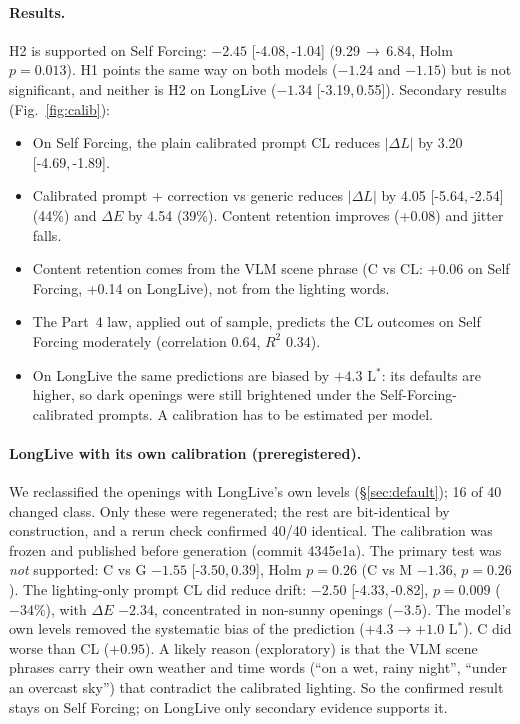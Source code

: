 \documentclass[11pt]{article}
\newcommand{\Lstar}{L$^{*}$}
\newcommand{\ci}[2]{[#1,\,#2]}
\begin{document}
\paragraph{Results.} H2 is supported on Self Forcing: $-2.45$ \ci{-4.08}{-1.04} (9.29\,$\to$\,6.84, Holm $p=0.013$).
H1 points the same way on both models ($-1.24$ and $-1.15$) but is not significant, and neither is H2 on LongLive
($-1.34$ \ci{-3.19}{0.55}). Secondary results (Fig.~\ref{fig:calib}):
\begin{itemize}
\item On Self Forcing, the plain calibrated prompt CL reduces $|\Delta L|$ by 3.20 \ci{-4.69}{-1.89}.
\item Calibrated prompt + correction vs generic reduces $|\Delta L|$ by 4.05 \ci{-5.64}{-2.54} (44\%) and $\Delta E$ by
4.54 (39\%). Content retention improves (+0.08) and jitter falls.
\item Content retention comes from the VLM scene phrase (C vs CL: +0.06 on Self Forcing, +0.14 on LongLive), not from
the lighting words.
\item The Part~4 law, applied out of sample, predicts the CL outcomes on Self Forcing moderately (correlation 0.64,
$R^2$ 0.34).
\item On LongLive the same predictions are biased by $+4.3$ \Lstar: its defaults are higher, so dark openings were
still brightened under the Self-Forcing-calibrated prompts. A calibration has to be estimated per model.
\end{itemize}

\paragraph{LongLive with its own calibration (preregistered).} We reclassified the openings with LongLive's own levels
(\S\ref{sec:default}); 16 of 40 changed class. Only these were regenerated; the rest are bit-identical by construction,
and a rerun check confirmed 40/40 identical. The calibration was frozen and published before generation (commit 4345e1a).
The primary test was \emph{not} supported: C vs G $-1.55$ \ci{-3.50}{0.39}, Holm $p=0.26$ (C vs M $-1.36$, $p=0.26$).
The lighting-only prompt CL did reduce drift: $-2.50$ \ci{-4.33}{-0.82}, $p=0.009$ ($-34\%$), with $\Delta E$ $-2.34$,
concentrated in non-sunny openings ($-3.5$). The model's own levels removed the systematic bias of the prediction
($+4.3\to+1.0$ \Lstar). C did worse than CL ($+0.95$). A likely reason (exploratory) is that the VLM scene phrases
carry their own weather and time words (``on a wet, rainy night'', ``under an overcast sky'') that contradict the
calibrated lighting. So the confirmed result stays on Self Forcing; on LongLive only secondary evidence supports it.
\end{document}
